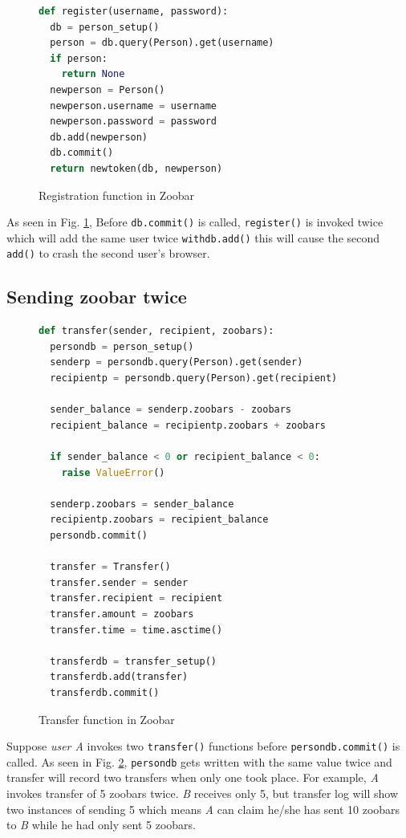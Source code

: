 \documentclass{llncs}
\begin{document}
\begin{figure}
  \begin{lstlisting}[language=Python]
def register(username, password):
  db = person_setup()
  person = db.query(Person).get(username)
  if person:
    return None
  newperson = Person()
  newperson.username = username
  newperson.password = password
  db.add(newperson)
  db.commit()
  return newtoken(db, newperson)
  \end{lstlisting}
  \caption{Registration function in Zoobar}
  \label{fig:registration}
\end{figure}

As seen in Fig. \ref{fig:registration}, Before \texttt{db.commit()} is
called, \texttt{register()} is invoked twice which will add the same
user twice \texttt{withdb.add()} this will cause the second
\texttt{add()} to crash the second user's browser.

\subsection{Sending zoobar twice}

\begin{figure}
  \begin{lstlisting}[language=Python]
def transfer(sender, recipient, zoobars):
  persondb = person_setup()
  senderp = persondb.query(Person).get(sender)
  recipientp = persondb.query(Person).get(recipient)

  sender_balance = senderp.zoobars - zoobars
  recipient_balance = recipientp.zoobars + zoobars

  if sender_balance < 0 or recipient_balance < 0:
    raise ValueError()

  senderp.zoobars = sender_balance
  recipientp.zoobars = recipient_balance
  persondb.commit()

  transfer = Transfer()
  transfer.sender = sender
  transfer.recipient = recipient
  transfer.amount = zoobars
  transfer.time = time.asctime()

  transferdb = transfer_setup()
  transferdb.add(transfer)
  transferdb.commit()
  \end{lstlisting}
  \caption{Transfer function in Zoobar}
  \label{fig:transfer}
\end{figure}

Suppose \textit{user A} invokes two \texttt{transfer()} functions
before \texttt{persondb.commit()} is called. As seen in
Fig. \ref{fig:transfer}, \texttt{persondb} gets written with the same
value twice and transfer will record two transfers when only one took
place. For example, \textit{A} invokes transfer of 5 zoobars
twice. \textit{B} receives only 5, but transfer log will show two
instances of sending 5 which means \textit{A} can claim he/she has
sent 10 zoobars to \textit{B} while he had only sent 5 zoobars.
\end{document}
